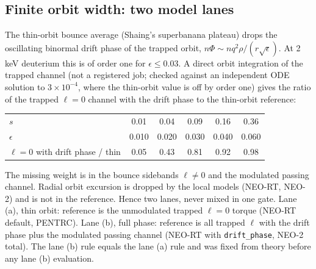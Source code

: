 \subsection*{Finite orbit width: two model lanes}
The thin-orbit bounce average (Shaing's superbanana plateau) drops the oscillating binormal drift phase
of the trapped orbit, $n\Phi\sim nq^2\rho/(r\sqrt\epsilon)$. At 2\,keV deuterium this is of order one for
$\epsilon\le0.03$. A direct orbit integration of the trapped channel (not a registered job; checked against
an independent ODE solution to $3\times10^{-4}$, where the thin-orbit value is off by order one) gives the
ratio of the trapped $\ell=0$ channel with the drift phase to the thin-orbit reference:

\begin{center}\small
\begin{tabular}{lccccc}
\toprule
$s$ & 0.01 & 0.04 & 0.09 & 0.16 & 0.36 \\
$\epsilon$ & 0.010 & 0.020 & 0.030 & 0.040 & 0.060 \\
$\ell=0$ with drift phase / thin & 0.05 & 0.43 & 0.81 & 0.92 & 0.98 \\
\bottomrule
\end{tabular}
\end{center}

The missing weight is in the bounce sidebands $\ell\ne0$ and the modulated passing channel. Radial orbit excursion
is dropped by the local models (NEO-RT, NEO-2) and is not in the reference. Hence two lanes,
never mixed in one gate. Lane (a), thin orbit: reference is the unmodulated trapped $\ell=0$ torque
(NEO-RT default, PENTRC). Lane (b), full phase: reference is all trapped $\ell$ with the drift
phase plus the modulated passing channel (NEO-RT with \texttt{drift\_phase}, NEO-2 total). The lane (b)
rule equals the lane (a) rule and was fixed from theory before any lane (b) evaluation.

